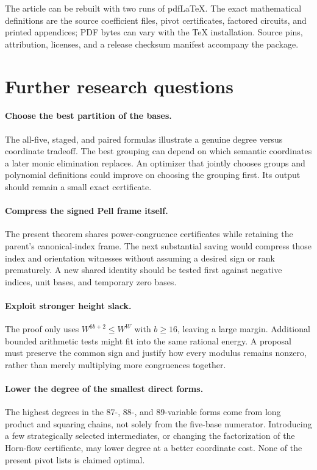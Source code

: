 \documentclass[11pt]{article}
\theoremstyle{definition}\newtheorem{definition}[theorem]{Definition}
\theoremstyle{remark}\newtheorem{remark}[theorem]{Remark}
\begin{document}
The article can be rebuilt with two runs of pdfLaTeX. The exact
mathematical definitions are the source coefficient files, pivot
certificates, factored circuits, and printed appendices; PDF bytes can
vary with the TeX installation. Source pins, attribution, licenses,
and a release checksum manifest accompany the package.

\section{Further research questions}

\paragraph{Choose the best partition of the bases.}
The all-five, staged, and paired formulas illustrate a genuine degree
versus coordinate tradeoff. The best grouping can depend on which semantic
coordinates a later monic elimination replaces. An optimizer that jointly
chooses groups and polynomial definitions could improve on choosing the
grouping first. Its output should remain a small exact certificate.

\paragraph{Compress the signed Pell frame itself.}
The present theorem shares power-congruence certificates while retaining
the parent's canonical-index frame. The next substantial saving would
compress those index and orientation witnesses without assuming a desired
sign or rank prematurely. A new shared identity should be tested first
against negative indices, unit bases, and temporary zero bases.

\paragraph{Exploit stronger height slack.}
The proof only uses $W^{6b+2}\le W^W$ with $b\ge16$, leaving a large
margin. Additional bounded arithmetic tests might fit into the same
rational energy. A proposal must preserve the common sign and justify
how every modulus remains nonzero, rather than merely multiplying more
congruences together.

\paragraph{Lower the degree of the smallest direct forms.}
The highest degrees in the 87-, 88-, and 89-variable forms come from long
product and squaring chains, not solely from the five-base numerator.
Introducing a few strategically selected intermediates, or changing the
factorization of the Horn-flow certificate, may lower degree at a better
coordinate cost. None of the present pivot lists is claimed optimal.
\end{document}
